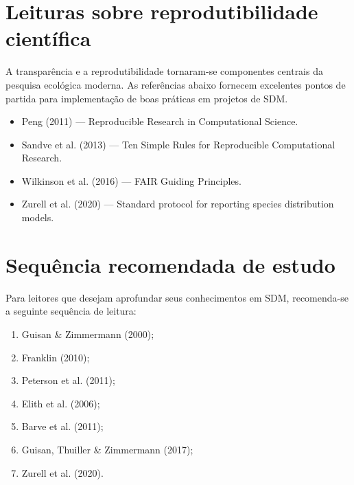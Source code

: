 \section{Leituras sobre reprodutibilidade científica}

A transparência e a reprodutibilidade tornaram-se componentes centrais da
pesquisa ecológica moderna. As referências abaixo fornecem excelentes pontos de
partida para implementação de boas práticas em projetos de SDM.

\begin{itemize}
	
	\item Peng (2011) --- Reproducible Research in Computational Science.
	
	\item Sandve et al. (2013) --- Ten Simple Rules for Reproducible Computational Research.
	
	\item Wilkinson et al. (2016) --- FAIR Guiding Principles.
	
	\item Zurell et al. (2020) --- Standard protocol for reporting species distribution models.
	
\end{itemize}

\section{Sequência recomendada de estudo}

Para leitores que desejam aprofundar seus conhecimentos em SDM, recomenda-se a
seguinte sequência de leitura:

\begin{enumerate}
	
	\item Guisan \& Zimmermann (2000);
	
	\item Franklin (2010);
	
	\item Peterson et al. (2011);
	
	\item Elith et al. (2006);
	
	\item Barve et al. (2011);
	
	\item Guisan, Thuiller \& Zimmermann (2017);
	
	\item Zurell et al. (2020).
	
\end{enumerate}

